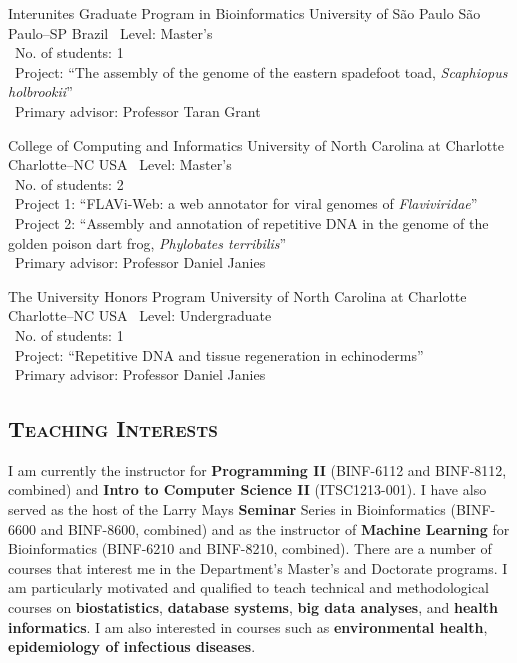 \documentclass[11pt, letterpaper, sans]{moderncv}
\begin{document}
{Interunites Graduate Program in Bioinformatics}
{University of São Paulo}
{São Paulo--SP}
{Brazil}
{
	\textbullet~Level: Master's\\
	\textbullet~No. of students: 1\\
	\textbullet~Project: ``The assembly of the genome of the eastern spadefoot toad, \emph{Scaphiopus holbrookii}''\\
	\textbullet~Primary advisor: Professor Taran Grant\\
}

\cventry{---}
{College of Computing and Informatics}
{University of North Carolina at Charlotte}
{Charlotte--NC}
{USA}
{
	\textbullet~Level: Master's\\
	\textbullet~No. of students: 2\\
	\textbullet~Project 1: ``FLAVi-Web: a web annotator for viral genomes of \emph{Flaviviridae}''\\
	\textbullet~Project 2: ``Assembly and annotation of repetitive DNA in the genome of the golden poison dart frog, \emph{Phylobates terribilis}''\\
	\textbullet~Primary advisor: Professor Daniel Janies\\
}

\cventry{---}
{The University Honors Program}
{University of North Carolina at Charlotte}
{Charlotte--NC}
{USA}
{
	\textbullet~Level: Undergraduate\\
	\textbullet~No. of students: 1\\
	\textbullet~Project: ``Repetitive DNA and tissue regeneration in echinoderms''\\
	\textbullet~Primary advisor: Professor Daniel Janies\\
}

\vspace{.5em}
	\subsection{\textsc{Teaching Interests}}
\vspace{.5em}

I am currently the instructor for \textbf{Programming II} (BINF-6112 and BINF-8112, combined) and \textbf{Intro to Computer Science II} (ITSC1213-001). I have also served as the host of the Larry Mays \textbf{Seminar} Series in Bioinformatics (BINF-6600 and BINF-8600, combined) and as the instructor of \textbf{Machine Learning} for Bioinformatics (BINF-6210 and BINF-8210, combined). There are a number of courses that interest me in the Department's Master's and Doctorate programs. I am particularly motivated and qualified to teach technical and methodological courses on \textbf{biostatistics}, \textbf{database systems}, \textbf{big data analyses}, and \textbf{health informatics}. I am also interested in courses such as \textbf{environmental health}, \textbf{epidemiology of infectious diseases}.
\end{document}

